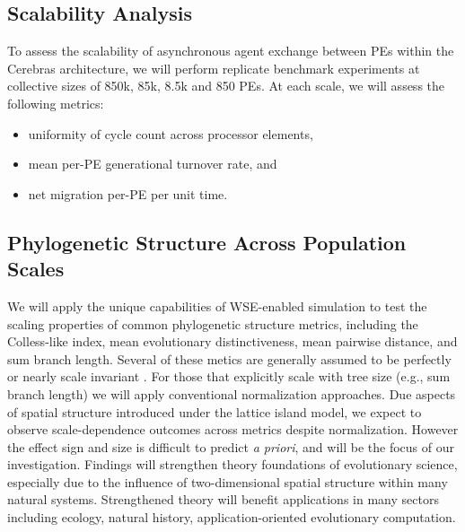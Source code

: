 \subsection{Scalability Analysis}

To assess the scalability of asynchronous agent exchange between PEs within the Cerebras architecture, we will perform replicate benchmark experiments at collective sizes of 850k, 85k, 8.5k and 850 PEs.
At each scale, we will assess the following metrics:
\begin{itemize}
\item uniformity of cycle count across processor elements,
\item mean per-PE generational turnover rate, and
\item net migration per-PE per unit time.
\end{itemize}

\subsection{Phylogenetic Structure Across Population Scales}

We will apply the unique capabilities of WSE-enabled simulation to test the scaling properties of common phylogenetic structure metrics, including the Colless-like index, mean evolutionary distinctiveness, mean pairwise distance, and sum branch length.
Several of these metics are generally assumed to be perfectly or nearly scale invariant \citep{TODOaskemily}.
For those that explicitly scale with tree size (e.g., sum branch length) we will apply conventional normalization approaches.
Due aspects of spatial structure introduced under the lattice island model, we expect to observe scale-dependence outcomes across metrics despite normalization.
However the effect sign and size is difficult to predict \textit{a priori}, and will be the focus of our investigation.
Findings will strengthen theory foundations of evolutionary science, especially due to the influence of two-dimensional spatial structure within many natural systems.
Strengthened theory will benefit applications in many sectors including ecology, natural history, application-oriented evolutionary computation.


